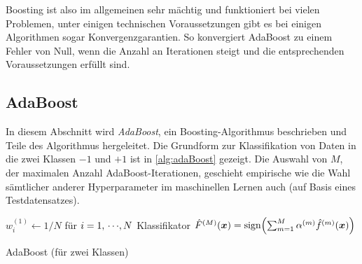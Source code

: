 		Boosting ist also im allgemeinen sehr mächtig und funktioniert bei vielen Problemen, unter einigen technischen Voraussetzungen gibt es bei einigen Algorithmen sogar Konvergenzgarantien. So konvergiert \bspw AdaBoost zu einem Fehler von Null, wenn die Anzahl an Iterationen steigt und die entsprechenden Voraussetzungen erfüllt sind.

		\subsection{AdaBoost}
			In diesem Abschnitt wird \emph{AdaBoost}, ein Boosting-Algorithmus beschrieben und Teile des Algorithmus hergeleitet. Die Grundform zur Klassifikation von Daten in die zwei Klassen \( -1 \) und \( +1 \) ist in \autoref{alg:adaBoost} gezeigt. Die Auswahl von \(M\), der maximalen Anzahl AdaBoost-Iterationen, geschieht empirische wie die Wahl sämtlicher anderer Hyperparameter im maschinellen Lernen auch (\zB auf Basis eines Testdatensatzes).

			\begin{algorithm}  \DontPrintSemicolon
				\( w_i^{(1)} \gets 1/N \) für \( i = 1,\,\cdots\!,N \) \;
				\Return Klassifikator \( \hat{F}^{(M)}(\bm{x}) = \operatorname{sign}\!\Big(\! \sum_{m = 1}^{M} \alpha^{(m)} \hat{f}^{(m)}(\bm{x}) \Big) \) \;
				\caption{AdaBoost (für zwei Klassen)}
				\label{alg:adaBoost}
			\end{algorithm}

